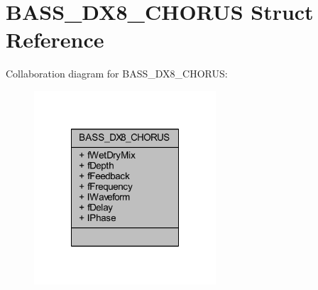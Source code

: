 \hypertarget{struct_b_a_s_s___d_x8___c_h_o_r_u_s}{\section{B\-A\-S\-S\-\_\-\-D\-X8\-\_\-\-C\-H\-O\-R\-U\-S Struct Reference}
\label{struct_b_a_s_s___d_x8___c_h_o_r_u_s}
}


Collaboration diagram for B\-A\-S\-S\-\_\-\-D\-X8\-\_\-\-C\-H\-O\-R\-U\-S\-:\nopagebreak
\begin{figure}[H]
\begin{center}
\leavevmode
\includegraphics[width=192pt]{struct_b_a_s_s___d_x8___c_h_o_r_u_s__coll__graph}
\end{center}
\end{figure}
